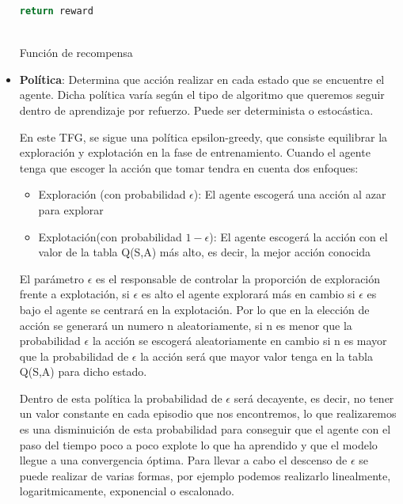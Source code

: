 \begin{itemize}
\begin{code}[H]
\begin{lstlisting}[language=Python]
        return reward
       
      \end{lstlisting}
      \caption[Función de recompensa]{Función de recompensa}
      \label{cod:recompensa}
      \end{code}
    \item \textbf{Política}: Determina que acción realizar en cada estado que se encuentre el agente. Dicha política varía según el tipo de algoritmo que queremos seguir dentro de aprendizaje por refuerzo.
    Puede ser determinista o estocástica.

    En este TFG, se sigue una política epsilon-greedy\cite{Epsilon-greedy}, que consiste 
 equilibrar la exploración y explotación en la fase de entrenamiento. Cuando el agente tenga que escoger la acción que tomar tendra en cuenta dos enfoques:
 
 \begin{itemize}
   \item Exploración (con probabilidad $\epsilon$): El agente escogerá una acción al azar para explorar
   \item Explotación(con probabilidad $ 1 - \epsilon$): El agente escogerá la acción con el valor de la tabla Q(S,A) más alto, es decir, la mejor acción conocida
 \end{itemize}
 
 El parámetro $\epsilon$ es el responsable de controlar la proporción de exploración frente a explotación, si $\epsilon$ es alto el agente explorará más en cambio si $\epsilon$ es bajo
 el agente se centrará en la explotación. Por lo que en la elección de acción se generará un numero n aleatoriamente, si n es menor que la probabilidad $\epsilon$ la acción se escogerá aleatoriamente
 en cambio si n es mayor que la probabilidad de $\epsilon$ la acción será que mayor valor tenga en la tabla Q(S,A) para dicho estado. \newline
 
 Dentro de esta política la probabilidad de $\epsilon$ será decayente, es decir, no tener un valor constante en cada episodio que nos encontremos, lo que realizaremos es una disminuición 
 de esta probabilidad para conseguir que el agente con el paso del tiempo poco a poco explote lo que ha aprendido y que el modelo llegue a una convergencia óptima. Para llevar a cabo el descenso
 de $\epsilon$ se puede realizar de varias formas, por ejemplo podemos realizarlo linealmente, logaritmicamente, exponencial o escalonado. \newline
  \end{itemize}

